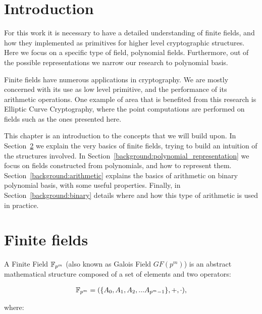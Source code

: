 \section{Introduction}

For this work it is necessary to have a detailed understanding of finite fields, and how they implemented as primitives for higher level cryptographic structures. Here we focus on a specific type of field, polynomial fields. Furthermore, out of the possible representations we narrow our research to polynomial basis.

Finite fields have numerous applications in cryptography. We are mostly concerned with its use as low level primitive, and the performance of its arithmetic operations. One example of area that is benefited from this research is Elliptic Curve Cryptography, where the point computations are performed on fields such as the ones presented here.

This chapter is an introduction to the concepts that we will build upon. In Section~\ref{background:finite_fields} we explain the very basics of finite fields, trying to build an intuition of the structures involved. In Section~\ref{background:polynomial_representation} we focus on fields constructed from polynomials, and how to represent them. Section~\ref{background:arithmetic} explains the basics of arithmetic on binary polynomial basis, with some useful properties. Finally, in Section~\ref{background:binary} details where and how this type of arithmetic is used in practice.

\section{Finite fields} \label{background:finite_fields}

A Finite Field $\mathbb{F}_{p^m}$ (also known as Galois Field $GF(p^m)$) is an abstract mathematical structure composed of a set of elements and two operators:

\begin{gather*}
\mathbb{F}_{p^m} = (\{A_0, A_1, A_2, ... A_{p^m-1}\}, +, \cdot),
\end{gather*}

where:

